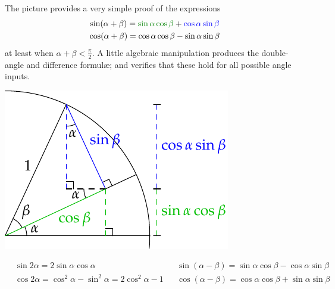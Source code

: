 \begin{minipage}[t]{0.63\linewidth}\vspace{-10pt}
\label{sec:multangle}

The picture provides a very simple proof of the expressions
\begin{gather*}
\sin(\alpha+\beta)=\textcolor{Green}{\sin\alpha\cos\beta}+\textcolor{blue}{\cos\alpha\sin\beta}\\
\cos(\alpha+\beta)=\cos\alpha\cos\beta-\sin\alpha\sin\beta
\end{gather*}
at least when $\alpha+\beta<\frac\pi 2$. A little algebraic manipulation produces the double-angle and difference formulæ; and verifies that these hold for all possible angle inputs.
\end{minipage}\hfill\begin{minipage}[t]{0.36\linewidth}\vspace{0pt}
	\flushright\includegraphics[scale=0.9]{angles-multipleangle}
\end{minipage}\par
\begin{align*}
&\sin 2\alpha=2\sin\alpha\cos\alpha &&\sin(\alpha-\beta)=\sin\alpha\cos\beta-\cos\alpha\sin\beta\\
&\cos 2\alpha=\cos^2\alpha-\sin^2\alpha=2\cos^2\alpha-1&&\cos(\alpha-\beta)=\cos\alpha\cos\beta+\sin\alpha\sin\beta
\end{align*}

\smallskip

